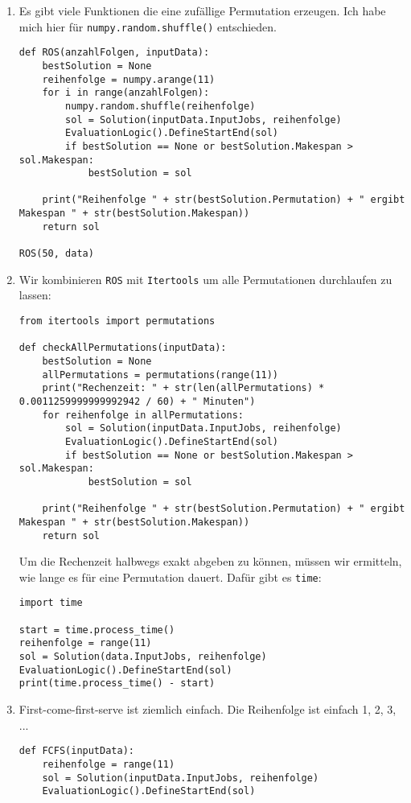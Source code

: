 \documentclass{article}
\begin{document}
	\begin{enumerate}[label=(\alph*)]
		\item Es gibt viele Funktionen die eine zufällige Permutation erzeugen. Ich habe mich hier für \texttt{numpy.random.shuffle()} entschieden.
		\begin{lstlisting}
def ROS(anzahlFolgen, inputData):
	bestSolution = None
	reihenfolge = numpy.arange(11)
	for i in range(anzahlFolgen):
		numpy.random.shuffle(reihenfolge)
		sol = Solution(inputData.InputJobs, reihenfolge)
		EvaluationLogic().DefineStartEnd(sol)
		if bestSolution == None or bestSolution.Makespan > sol.Makespan:
			bestSolution = sol

	print("Reihenfolge " + str(bestSolution.Permutation) + " ergibt Makespan " + str(bestSolution.Makespan))
	return sol

ROS(50, data)
		\end{lstlisting}
		\item Wir kombinieren \texttt{ROS} mit \texttt{Itertools} um alle Permutationen durchlaufen zu lassen:
		\begin{lstlisting}
from itertools import permutations

def checkAllPermutations(inputData):
	bestSolution = None
	allPermutations = permutations(range(11))
	print("Rechenzeit: " + str(len(allPermutations) * 0.0011259999999992942 / 60) + " Minuten")
	for reihenfolge in allPermutations:
		sol = Solution(inputData.InputJobs, reihenfolge)
		EvaluationLogic().DefineStartEnd(sol)
		if bestSolution == None or bestSolution.Makespan > sol.Makespan:
			bestSolution = sol

	print("Reihenfolge " + str(bestSolution.Permutation) + " ergibt Makespan " + str(bestSolution.Makespan))
	return sol
		\end{lstlisting}
		Um die Rechenzeit halbwegs exakt abgeben zu können, müssen wir ermitteln, wie lange es für eine Permutation dauert. Dafür gibt es \texttt{time}:
		\begin{lstlisting}
import time

start = time.process_time()
reihenfolge = range(11)
sol = Solution(data.InputJobs, reihenfolge)
EvaluationLogic().DefineStartEnd(sol)
print(time.process_time() - start)
		\end{lstlisting}
		\item First-come-first-serve ist ziemlich einfach. Die Reihenfolge ist einfach 1, 2, 3, ...
		\begin{lstlisting}
def FCFS(inputData):
	reihenfolge = range(11)
	sol = Solution(inputData.InputJobs, reihenfolge)
	EvaluationLogic().DefineStartEnd(sol)


\end{lstlisting}
\end{enumerate}
\end{document}
